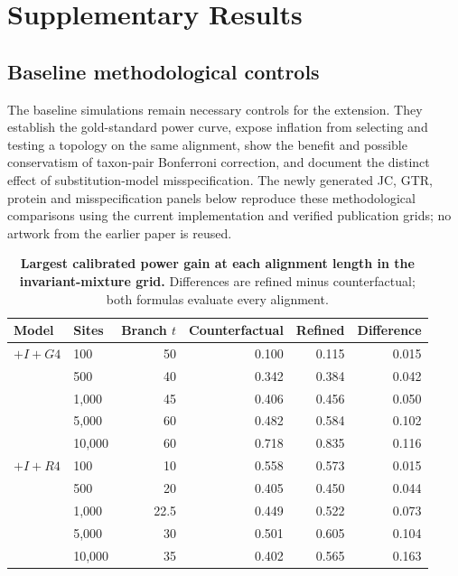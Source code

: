 \renewcommand{\thefigure}{S\arabic{figure}}
\renewcommand{\thetable}{S\arabic{table}}
\renewcommand{\theHfigure}{S\arabic{figure}}
\renewcommand{\theHtable}{S\arabic{table}}
\setcounter{figure}{0}
\setcounter{table}{0}
\section*{Supplementary Results}

\subsection*{Baseline methodological controls}

The baseline simulations remain necessary controls for the extension. They establish the gold-standard power curve, expose inflation from selecting and testing a topology on the same alignment, show the benefit and possible conservatism of taxon-pair Bonferroni correction, and document the distinct effect of substitution-model misspecification. The newly generated JC, GTR, protein and misspecification panels below reproduce these methodological comparisons using the current implementation and verified publication grids; no artwork from the earlier paper is reused.

\begin{table}[p]
  \centering
  \small
  \begin{tabular}{llrrrr}
    \toprule
    Model & Sites & Branch \(t\) & Counterfactual & Refined & Difference \\
    \midrule
    \(+I+G4\) & 100 & 50 & 0.100 & 0.115 & 0.015 \\
     & 500 & 40 & 0.342 & 0.384 & 0.042 \\
     & 1,000 & 45 & 0.406 & 0.456 & 0.050 \\
     & 5,000 & 60 & 0.482 & 0.584 & 0.102 \\
     & 10,000 & 60 & 0.718 & 0.835 & 0.116 \\
    \addlinespace
    \(+I+R4\) & 100 & 10 & 0.558 & 0.573 & 0.015 \\
     & 500 & 20 & 0.405 & 0.450 & 0.044 \\
     & 1,000 & 22.5 & 0.449 & 0.522 & 0.073 \\
     & 5,000 & 30 & 0.501 & 0.605 & 0.104 \\
     & 10,000 & 35 & 0.402 & 0.565 & 0.163 \\
    \bottomrule
  \end{tabular}
  \caption{\textbf{Largest calibrated power gain at each alignment length in the invariant-mixture grid.} Differences are refined minus counterfactual; both formulas evaluate every alignment.}
\end{table}

